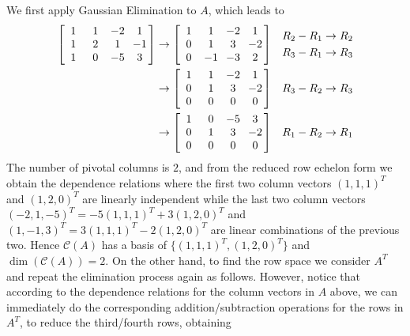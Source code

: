 \begin{solution}
We first apply Gaussian Elimination to $A$, which leads to
\begin{align*}
\left[\begin{array}{@{\;}wc{10pt}wc{10pt}wc{10pt}wc{10pt}@{\;}}
1 & 1 & -2 & 1 \\
1 & 2 & 1 & -1 \\
1 & 0 & -5 & 3
\end{array}\right]
& \rightarrow
\left[\begin{array}{@{\;}wc{10pt}wc{10pt}wc{10pt}wc{10pt}@{\;}}
1 & 1 & -2 & 1 \\
0 & 1 & 3 & -2 \\
0 & -1 & -3 & 2
\end{array}\right]
& \begin{aligned}
R_2 - R_1 &\to R_2 \\
R_3 - R_1 &\to R_3
\end{aligned} \\
& \rightarrow
\left[\begin{array}{@{\;}wc{10pt}wc{10pt}wc{10pt}wc{10pt}@{\;}}
1 & 1 & -2 & 1 \\
0 & 1 & 3 & -2 \\
0 & 0 & 0 & 0
\end{array}\right]
& R_3 - R_2 \to R_3 \\
& \rightarrow
\left[\begin{array}{@{\;}wc{10pt}wc{10pt}wc{10pt}wc{10pt}@{\;}}
1 & 0 & -5 & 3 \\
0 & 1 & 3 & -2 \\
0 & 0 & 0 & 0
\end{array}\right]
& R_1 - R_2 \to R_1
\end{align*}
The number of pivotal columns is $2$, and from the reduced row echelon form we obtain the dependence relations where the first two column vectors $(1,1,1)^T$ and $(1,2,0)^T$ are linearly independent while the last two column vectors $(-2,1,-5)^T = -5(1,1,1)^T + 3(1,2,0)^T$ and $(1,-1,3)^T = 3(1,1,1)^T - 2(1,2,0)^T$ are linear combinations of the previous two. Hence $\mathcal{C}(A)$ has a basis of $\{(1,1,1)^T, (1,2,0)^T\}$ and $\dim(\mathcal{C}(A)) = 2$. On the other hand, to find the row space we consider $A^T$ and repeat the elimination process again as follows. However, notice that according to the dependence relations for the column vectors in $A$ above, we can immediately do the corresponding addition/subtraction operations for the rows in $A^T$, to reduce the third/fourth rows, obtaining
\begin{align*}

\end{align*}
\end{solution}
